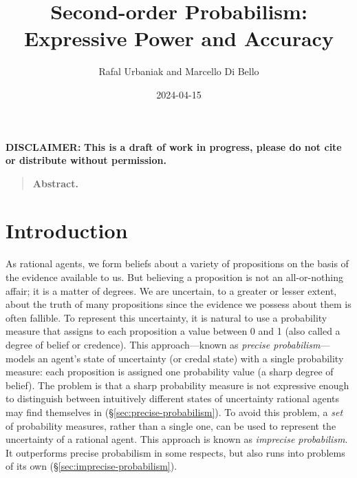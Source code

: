 \documentclass[
  letterpaper,
  DIV=11,
  numbers=noendperiod]{scrartcl}
\title{Second-order Probabilism: Expressive Power and Accuracy}
\author{Rafal Urbaniak and Marcello Di Bello}
\date{2024-04-15}
\renewcommand*\contentsname{Table of contents}
\newcommand\contentsname{Table of contents}
\begin{document}
\maketitle
\ifdefined\Shaded\renewenvironment{Shaded}{\begin{tcolorbox}[enhanced, boxrule=0pt, borderline west={3pt}{0pt}{shadecolor}, interior hidden, sharp corners, breakable, frame hidden]}{\end{tcolorbox}}\fi

\renewcommand*\contentsname{Table of contents}
{
\hypersetup{linkcolor=}
\setcounter{tocdepth}{3}
\tableofcontents
}
\vspace{2cm}

\noindent \textbf{DISCLAIMER:}
\textbf{This is a draft of work in progress, please do not cite or distribute without permission.}

\thispagestyle{empty}

\newpage

\begin{quote} \textbf{Abstract.}  

\end{quote}

\hypertarget{introduction}{%
\section{Introduction}\label{introduction}}

\label{sec:introduction}

As rational agents, we form beliefs about a variety of propositions on
the basis of the evidence available to us. But believing a proposition
is not an all-or-nothing affair; it is a matter of degrees. We are
uncertain, to a greater or lesser extent, about the truth of many
propositions since the evidence we possess about them is often fallible.
To represent this uncertainty, it is natural to use a probability
measure that assigns to each proposition a value between 0 and 1 (also
called a degree of belief or credence). This approach---known as
\emph{precise probabilism}---models an agent's state of uncertainty (or
credal state) with a single probability measure: each proposition is
assigned one probability value (a sharp degree of belief). The problem
is that a sharp probability measure is not expressive enough to
distinguish between intuitively different states of uncertainty rational
agents may find themselves in (\S \ref{sec:precise-probabilism}). To
avoid this problem, a \emph{set} of probability measures, rather than a
single one, can be used to represent the uncertainty of a rational
agent. This approach is known as \emph{imprecise probabilism}. It
outperforms precise probabilism in some respects, but also runs into
problems of its own (\S \ref{sec:imprecise-probabilism}).
\end{document}
